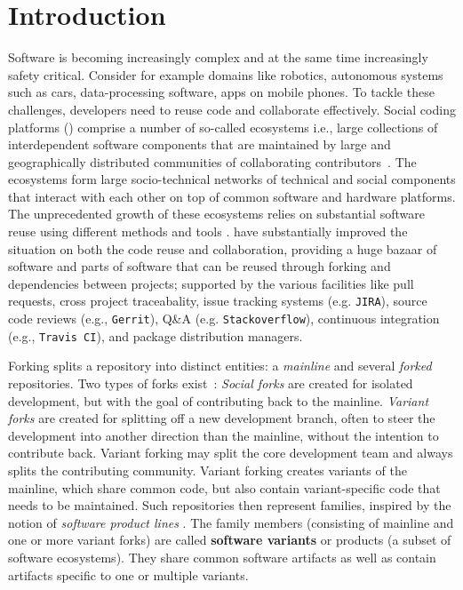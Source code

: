 \section{Introduction}
Software is becoming increasingly complex and at the same time increasingly safety critical.
Consider for example domains like robotics, autonomous systems such as cars, data-processing software, apps on mobile phones.
To tackle these challenges, developers need to reuse code and collaborate effectively.
Social coding platforms (\scp) comprise a number of so-called ecosystems i.e., large collections of interdependent software components that are maintained by large and geographically distributed communities of collaborating contributors~\cite{lungu:2008,decan:2017}. 
The ecosystems form large socio-technical networks of technical and social components that interact with each other on top of common software and hardware platforms.
The unprecedented growth of these ecosystems relies on substantial software reuse using different methods and tools \cite{mojica2014large}. 
\scp have substantially improved the situation on both the code reuse and collaboration, providing a huge bazaar of software and parts of software that can be reused through forking and dependencies between projects; supported by the various facilities like pull requests, cross project traceabality, issue tracking systems (e.g. \texttt{JIRA}), source code reviews (e.g., \texttt{Gerrit}), Q\&A (e.g. \texttt{Stackoverflow}), continuous integration (e.g., \texttt{Travis CI}), and package distribution managers.




Forking splits a repository into distinct entities: a \textit{mainline} and several \textit{forked} repositories.
Two types of forks exist~\cite{Zhou:2020}: \textit{Social forks} are created for isolated development, but with the goal of contributing back to the mainline.
\textit{Variant forks} are created for splitting off a new development branch, often to steer the development into another direction than the mainline, without the intention to contribute back.
Variant forking may split the core development team and always splits the contributing community.
Variant forking creates variants of the mainline, which share common code, but also contain variant-specific code that needs to be maintained.
Such repositories then represent families, inspired by the notion of \textit{software product lines} \cite{berger.ea:2020:emse}.
The family members (consisting of mainline and one or more variant forks) are called \textbf{software variants} or products (a subset of software ecosystems).
They share common software artifacts as well as contain artifacts specific to one or multiple variants. 

